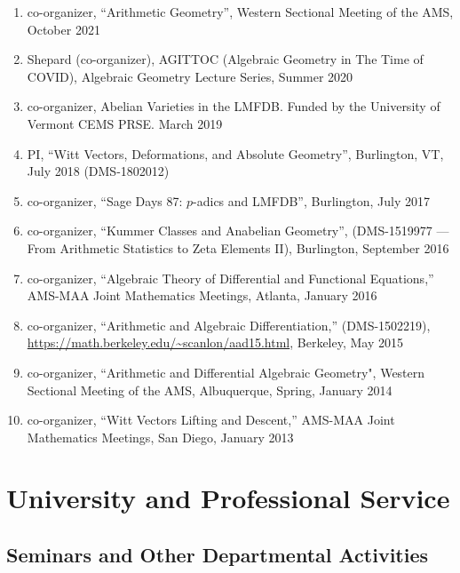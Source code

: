 \documentclass[a4paper,10pt]{article}
\begin{document}
\begin{enumerate} %
	\item co-organizer, ``Arithmetic Geometry'', Western Sectional Meeting of the AMS, October 2021
	\item Shepard (co-organizer), AGITTOC (Algebraic Geometry in The Time of COVID), Algebraic Geometry Lecture Series, Summer 2020  
	\item co-organizer, Abelian Varieties in the LMFDB. Funded by the University of Vermont CEMS PRSE. March 2019
	\item PI, ``Witt Vectors, Deformations, and Absolute Geometry'', Burlington, VT, July 2018 (DMS-1802012)
	\item co-organizer, ``Sage Days 87: $p$-adics and LMFDB'', Burlington, July 2017
	\item co-organizer, ``Kummer Classes and Anabelian Geometry'', (DMS-1519977 --- From Arithmetic Statistics to Zeta Elements II), Burlington, September 2016
	\item co-organizer, ``Algebraic Theory of Differential and Functional Equations,''  AMS-MAA Joint Mathematics Meetings, Atlanta, January 2016
	\item co-organizer, ``Arithmetic and Algebraic Differentiation,'' (DMS-1502219), \url{https://math.berkeley.edu/~scanlon/aad15.html}, Berkeley, May 2015 
	\item co-organizer, ``Arithmetic and Differential Algebraic Geometry", Western Sectional Meeting of the AMS, Albuquerque, Spring, January 2014
	\item co-organizer, ``Witt Vectors Lifting and Descent,'' AMS-MAA Joint Mathematics Meetings, San Diego, January 2013
\end{enumerate}

\section*{University and Professional Service}
\subsection*{Seminars and Other Departmental Activities}
\end{document}
